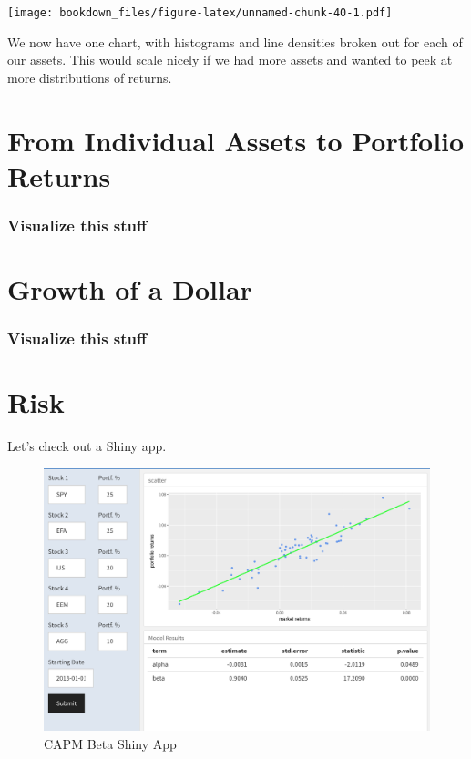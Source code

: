 \documentclass[]{krantz}
\begin{document}
\texttt{[image: bookdown\_files/figure-latex/unnamed-chunk-40-1.pdf]}

We now have one chart, with histograms and line densities broken out for
each of our assets. This would scale nicely if we had more assets and
wanted to peek at more distributions of returns.

\chapter{From Individual Assets to Portfolio
Returns}\label{from-individual-assets-to-portfolio-returns}

\subsection*{Visualize this stuff}\label{visualize-this-stuff}


\chapter{Growth of a Dollar}\label{growth-of-a-dollar}

\subsection*{Visualize this stuff}\label{visualize-this-stuff-1}


\chapter{Risk}\label{risk}

Let's check out a Shiny app.

\begin{figure}
\centering
\includegraphics{snapshots/snapshot-test.png}
\caption{CAPM Beta Shiny App}
\end{figure}
\end{document}

